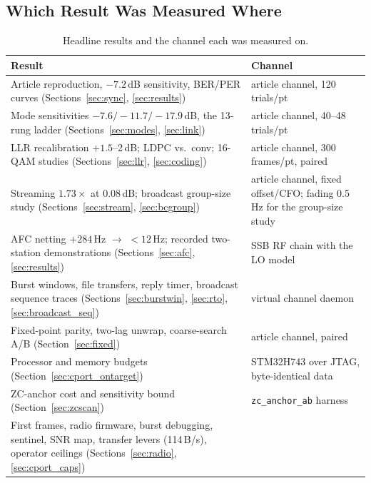 \subsection{Which Result Was Measured Where}
\label{sec:chan_map}

\begin{table}[H]
    \centering
    \caption{Headline results and the channel each was measured on.}
    \label{tab:channels}
    \small
    \begin{tabular}{@{}p{7.4cm}p{6.6cm}@{}}
    \toprule
    \textbf{Result} & \textbf{Channel} \\
    \midrule
    Article reproduction, $-7.2$\,dB sensitivity, BER/PER curves
        (Sections~\ref{sec:sync}, \ref{sec:results}) &
        article channel, 120 trials/pt \\
    Mode sensitivities $-7.6/-11.7/-17.9$\,dB, the 13-rung ladder
        (Sections~\ref{sec:modes}, \ref{sec:link}) &
        article channel, 40--48 trials/pt \\
    LLR recalibration $+1.5$--2\,dB; LDPC vs.\ conv; 16-QAM studies
        (Sections~\ref{sec:llr}, \ref{sec:coding}) &
        article channel, 300 frames/pt, paired \\
    Streaming $1.73\times$ at 0.08\,dB; broadcast group-size study
        (Sections~\ref{sec:stream}, \ref{sec:bcgroup}) &
        article channel, fixed offset/CFO; fading 0.5\,Hz for the
        group-size study \\
    AFC netting $+284$\,Hz $\to$ $<12$\,Hz; recorded two-station
        demonstrations (Sections~\ref{sec:afc}, \ref{sec:results}) &
        SSB RF chain with the LO model \\
    Burst windows, file transfers, reply timer, broadcast sequence
        traces (Sections~\ref{sec:burstwin}, \ref{sec:rto},
        \ref{sec:broadcast_seq}) & virtual channel daemon \\
    Fixed-point parity, two-lag unwrap, coarse-search A/B
        (Section~\ref{sec:fixed}) & article channel, paired \\
    Processor and memory budgets (Section~\ref{sec:cport_ontarget}) &
        STM32H743 over JTAG, byte-identical data \\
    ZC-anchor cost and sensitivity bound
        (Section~\ref{sec:zcscan}) & \texttt{zc\_anchor\_ab} harness \\
    First frames, radio firmware, burst debugging, sentinel, SNR map,
        transfer levers (114\,B/s), operator ceilings
        (Sections~\ref{sec:radio}, \ref{sec:cport_caps}) &

\end{tabular}
\end{table}
